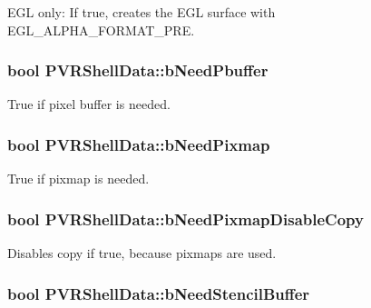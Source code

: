 E\+G\+L only\+: If true, creates the E\+G\+L surface with E\+G\+L\+\_\+\+A\+L\+P\+H\+A\+\_\+\+F\+O\+R\+M\+A\+T\+\_\+\+P\+R\+E. \hypertarget{struct_p_v_r_shell_data_adb7dcb92721adcb3361425e8483a5ed0}{
\subsubsection[{b\+Need\+Pbuffer}]{\setlength{\rightskip}{0pt plus 5cm}bool P\+V\+R\+Shell\+Data\+::b\+Need\+Pbuffer}}\label{struct_p_v_r_shell_data_adb7dcb92721adcb3361425e8483a5ed0}
True if pixel buffer is needed. \hypertarget{struct_p_v_r_shell_data_ae05b7b197352650f87de28f169f151a0}{
\subsubsection[{b\+Need\+Pixmap}]{\setlength{\rightskip}{0pt plus 5cm}bool P\+V\+R\+Shell\+Data\+::b\+Need\+Pixmap}}\label{struct_p_v_r_shell_data_ae05b7b197352650f87de28f169f151a0}
True if pixmap is needed. \hypertarget{struct_p_v_r_shell_data_aace01d10102fd454f9238554e2be6e13}{
\subsubsection[{b\+Need\+Pixmap\+Disable\+Copy}]{\setlength{\rightskip}{0pt plus 5cm}bool P\+V\+R\+Shell\+Data\+::b\+Need\+Pixmap\+Disable\+Copy}}\label{struct_p_v_r_shell_data_aace01d10102fd454f9238554e2be6e13}
Disables copy if true, because pixmaps are used. \hypertarget{struct_p_v_r_shell_data_ab3f6a20c714a67b2f337d1ca578e54ad}{
\subsubsection[{b\+Need\+Stencil\+Buffer}]{\setlength{\rightskip}{0pt plus 5cm}bool P\+V\+R\+Shell\+Data\+::b\+Need\+Stencil\+Buffer}}\label{struct_p_v_r_shell_data_ab3f6a20c714a67b2f337d1ca578e54ad}
